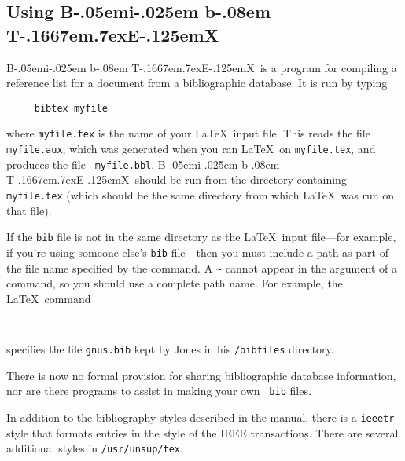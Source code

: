\documentclass{article}
\newcommand{\BibTeX}{{\rm B\kern-.05em{\sc i\kern-.025em b}\kern-.08em
    T\kern-.1667em\lower.7ex\hbox{E}\kern-.125emX}}
\begin{document}

\subsection{Using \BibTeX}

\BibTeX\ is a program for compiling a reference list for a document from
a bibliographic database.  It is run by typing
\begin{verbatim}
     bibtex myfile
\end{verbatim}
where \mbox{\tt myfile.tex} is the name of your \LaTeX\ input file.
This reads the file \mbox{\tt myfile.aux}, which was generated when you
ran \LaTeX\ on \mbox{\tt myfile.tex}, and produces the file \mbox{\tt
myfile.bbl}.  \BibTeX\ should be run from the directory containing
\mbox{\tt myfile.tex} (which should be the same directory from which
\LaTeX\ was run on that file).

If the {\tt bib} file is not in the same directory as the \LaTeX\ input
file---for example, if you're using someone else's {\tt bib}
file---then you must include a path as part of the file name specified
by the \hbox{\verb||} command.  A \verb|~| cannot appear
in the argument of a \hbox{\verb||} command, so you should
use a complete path name.  For example, the \LaTeX\ command
\begin{verbatim}
     
\end{verbatim}
specifies the file \mbox{\tt gnus.bib} kept by Jones in his 
\mbox{\tt /bibfiles} directory.


There is now no formal provision for sharing bibliographic database
information, nor are there programs to assist in making your own {\tt
bib} files.

In addition to the bibliography styles described in the manual, there
is a {\tt ieeetr} style that formats entries in the style of the IEEE
transactions.
There are several additional styles in {\tt /usr/unsup/tex}.
\end{document}
